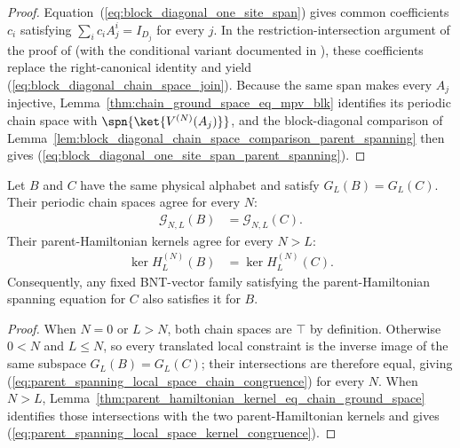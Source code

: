 \begin{proof}
    \leanok
    Equation~(\ref{eq:block_diagonal_one_site_span}) gives common
    coefficients $c_i$ satisfying $\sum_i c_iA_j^i=I_{D_j}$ for every $j$.
    In the restriction-intersection argument of the proof of
    \cite[Theorem~12]{PerezGarcia2007Matrix} (with the conditional variant
    documented in \cite{gap:pgvwc07_common_identity_coefficients}), these
    coefficients replace the right-canonical identity and yield
    (\ref{eq:block_diagonal_chain_space_join}). Because the same span makes
    every $A_j$ injective,
    Lemma~\ref{thm:chain_ground_space_eq_mpv_blk} identifies its periodic
    chain space with $\spn\{\ket{V^{(N)}(A_j)}\}$, and the block-diagonal
    comparison of
    Lemma~\ref{lem:block_diagonal_chain_space_comparison_parent_spanning}
    then gives (\ref{eq:block_diagonal_one_site_span_parent_spanning}).
\end{proof}

\begin{lemma}
    \label{lem:parent_spanning_of_local_space_eq}
    \leanok
    Let $B$ and $C$ have the same physical alphabet and satisfy $G_L(B)=G_L(C)$.
    Their periodic chain spaces agree for every $N$:
    \begin{align}
        \mathcal G_{N,L}(B)
         & =\mathcal G_{N,L}(C).
        \label{eq:parent_spanning_local_space_chain_congruence}
    \end{align}
    Their parent-Hamiltonian kernels agree for every $N>L$:
    \begin{align}
        \ker H_L^{(N)}(B)
         & =\ker H_L^{(N)}(C).
        \label{eq:parent_spanning_local_space_kernel_congruence}
    \end{align}
    Consequently, any fixed BNT-vector family satisfying the parent-Hamiltonian
    spanning equation for $C$ also satisfies it for $B$.
\end{lemma}

\begin{proof}
    \leanok
    When $N=0$ or $L>N$, both chain spaces are $\top$ by definition. Otherwise
    $0<N$ and $L\leq N$, so every translated local constraint is the inverse
    image of the same subspace $G_L(B)=G_L(C)$; their intersections are
    therefore equal, giving
    (\ref{eq:parent_spanning_local_space_chain_congruence}) for every $N$.
    When $N>L$,
    Lemma~\ref{thm:parent_hamiltonian_kernel_eq_chain_ground_space} identifies
    those intersections with the two parent-Hamiltonian kernels and gives
    (\ref{eq:parent_spanning_local_space_kernel_congruence}).
\end{proof}

